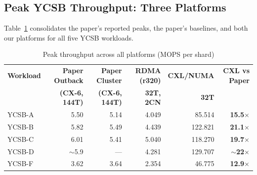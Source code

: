 \documentclass[conference]{IEEEtran}
\begin{document}
\subsection{Peak YCSB Throughput: Three Platforms}

Table~\ref{tab:three-way-peaks} consolidates the paper's reported peaks, the paper's baselines, and both our platforms for all five YCSB workloads.

\begin{table}[H]
\centering
\caption{Peak throughput across all platforms (MOPS per shard)}
\label{tab:three-way-peaks}
\small
\begin{tabular}{@{}lrrrrr@{}}
\toprule
\textbf{Workload} & \textbf{Paper Outback} & \textbf{Paper Cluster} & \textbf{RDMA (r320)} & \textbf{CXL/NUMA} & \textbf{CXL vs Paper} \\
 & \textbf{(CX-6, 144T)} & \textbf{(CX-6, 144T)} & \textbf{32T, 2CN} & \textbf{32T} & \\
\midrule
YCSB-A & 5.50 & 5.14 & 4.049 & 85.514 & \textbf{15.5$\times$} \\
YCSB-B & 5.82 & 5.49 & 4.439 & 122.821 & \textbf{21.1$\times$} \\
YCSB-C & 6.01 & 5.41 & 5.040 & 118.270 & \textbf{19.7$\times$} \\
YCSB-D & $\sim$5.9 & --- & 4.281 & 129.707 & \textbf{$\sim$22$\times$} \\
YCSB-F & 3.62 & 3.64 & 2.354 & 46.775 & \textbf{12.9$\times$} \\
\bottomrule
\end{tabular}
\end{table}
\end{document}
